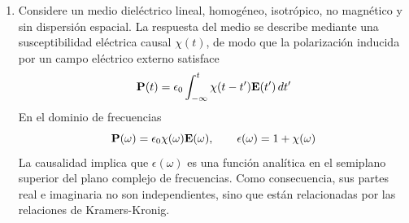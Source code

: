 \documentclass[]{article}
\numberwithin{equation}{section}
\begin{document}
\begin{enumerate}
	\item Considere un medio dieléctrico lineal, homogéneo, isotrópico, no magnético y sin dispersión espacial. La respuesta del medio se describe mediante una susceptibilidad eléctrica causal $\chi(t)$, de modo que la polarización inducida por un campo eléctrico externo satisface
	\begin{equation}
		\mathbf{P}(t) = \epsilon_{0} \int_{-\infty}^{t} \chi(t - t') \mathbf{E}(t') \, dt'
	\end{equation}
	En el dominio de frecuencias
	\begin{equation}
		\mathbf{P}(\omega) = \epsilon_{0} \chi(\omega)\mathbf{E}(\omega), \qquad \epsilon(\omega) = 1 + \chi(\omega)
	\end{equation}
	La causalidad implica que $\epsilon(\omega)$ es una función analítica en el semiplano superior del plano complejo de frecuencias. Como consecuencia, sus partes real e imaginaria no son independientes, sino que están relacionadas por las relaciones de Kramers-Kronig.
	

\end{enumerate}
\end{document}
